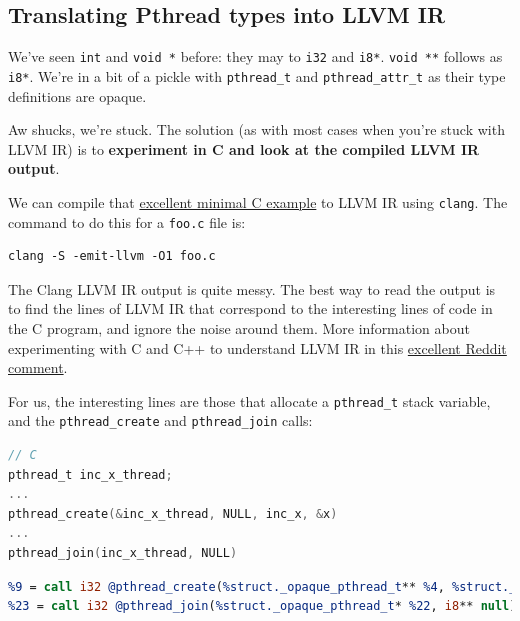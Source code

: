 \hypertarget{translating-pthread-types-into-llvm-ir}{%
\subsection{\texorpdfstring{\protect\hyperlink{translating-pthread-types-into-llvm-ir}{}Translating
Pthread types into LLVM
IR}{Translating Pthread types into LLVM IR}}\label{translating-pthread-types-into-llvm-ir}}

We've seen \texttt{int} and \texttt{void\ *} before: they may to
\texttt{i32} and \texttt{i8*}. \texttt{void\ **} follows as
\texttt{i8*}. We're in a bit of a pickle with \texttt{pthread\_t} and
\texttt{pthread\_attr\_t} as their type definitions are opaque.

Aw shucks, we're stuck. The solution (as with most cases when you're
stuck with LLVM IR) is to \textbf{experiment in C and look at the
compiled LLVM IR output}.

We can compile that
\href{https://timmurphy.org/2010/05/04/pthreads-in-c-a-minimal-working-example/}{excellent
minimal C example} to LLVM IR using \texttt{clang}. The command to do
this for a \texttt{foo.c} file is:


\begin{verbatim}
clang -S -emit-llvm -O1 foo.c
\end{verbatim}

The Clang LLVM IR output is quite messy. The best way to read the output
is to find the lines of LLVM IR that correspond to the interesting lines
of code in the C program, and ignore the noise around them. More
information about experimenting with C and C++ to understand LLVM IR in
this
\href{https://www.reddit.com/r/programming/comments/kjjijf/a_complete_guide_to_llvm_for_programming_language/gh2dnnj?utm_source=share\&utm_medium=web2x\&context=3}{excellent
Reddit comment}.

For us, the interesting lines are those that allocate a
\texttt{pthread\_t} stack variable, and the \texttt{pthread\_create} and
\texttt{pthread\_join} calls:

\begin{lstlisting}[language=C,caption={C}]
// C
pthread_t inc_x_thread;
...
pthread_create(&inc_x_thread, NULL, inc_x, &x)
...
pthread_join(inc_x_thread, NULL)
\end{lstlisting}

\begin{lstlisting}[language=llvm,caption={LLVM IR}]
%4 = alloca %struct._opaque_pthread_t*, align 8...
%9 = call i32 @pthread_create(%struct._opaque_pthread_t** %4, %struct._opaque_pthread_attr_t* null, i8* (i8*)* @inc_x, i8* %8)...
%23 = call i32 @pthread_join(%struct._opaque_pthread_t* %22, i8** null)
\end{lstlisting}


